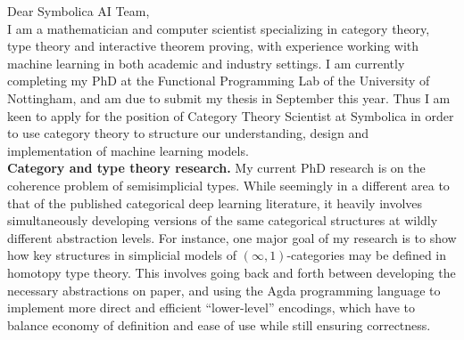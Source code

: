 \documentclass[12pt,a4paper]{article}
\newcommand{\hpar}[1]{\noindent\textbf{#1.}}
\begin{document}
\noindent Dear Symbolica AI Team, \\[2ex]
\phantom{x}\hspace{2ex}I am a mathematician and computer scientist specializing in category theory, type theory and interactive theorem proving, with experience working with machine learning in both academic and industry settings.
I am currently completing my PhD
at the Functional Programming Lab of the University of Nottingham, and am due to submit my thesis in September this year.
Thus I am keen to apply for the position of Category Theory Scientist at Symbolica in order to use category theory to structure our understanding, design and implementation of machine learning models.
\\[3ex]
%
\hpar{Category and type theory research}
My current PhD research is on the coherence problem of semisimplicial types.
While seemingly in a different area to that of the published categorical deep learning literature, it heavily involves simultaneously developing versions of the same categorical structures at wildly different abstraction levels.
For instance, one major goal of my research is to show how key structures in simplicial models of \((\infty, 1)\)-categories
may be defined in homotopy type theory.
This involves going back and forth between developing the necessary abstractions on paper, and using the Agda programming language to implement more direct and efficient “lower-level” encodings, which have to balance economy of definition and ease of use while still ensuring correctness.
\end{document}

